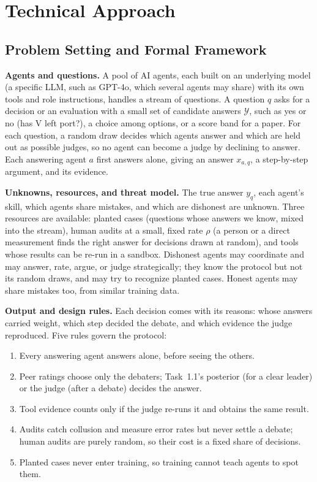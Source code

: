 \documentclass[12pt,letterpaper]{article}
\newcommand{\hd}[1]{\ifhmode\par\fi\addvspace{1pt}\noindent\textbf{#1}\hspace{0.35em}}
\begin{document}
\section{Technical Approach}\label{sec:approach}

\subsection{Problem Setting and Formal Framework}\label{sec:setting}
\hd{Agents and questions.} A pool of AI agents, each built on an underlying model (a specific LLM, such as GPT-4o, which several agents may share) with its own tools and role instructions, handles a stream of questions. A question $q$ asks for a decision or an evaluation with a small set of candidate answers $\mathcal{Y}$, such as yes or no (has V left port?), a choice among options, or a score band for a paper. For each question, a random draw decides which agents answer and which are held out as possible judges, so no agent can become a judge by declining to answer. Each answering agent $a$ first answers alone, giving an answer $x_{a,q}$, a step-by-step argument, and its evidence.

\hd{Unknowns, resources, and threat model.} The true answer $y_q$, each agent's skill, which agents share mistakes, and which are dishonest are unknown. Three resources are available: planted cases (questions whose answers we know, mixed into the stream), human audits at a small, fixed rate $\rho$ (a person or a direct measurement finds the right answer for decisions drawn at random), and tools whose results can be re-run in a sandbox. Dishonest agents may coordinate and may answer, rate, argue, or judge strategically; they know the protocol but not its random draws, and may try to recognize planted cases. Honest agents may share mistakes too, from similar training data.

\hd{Output and design rules.} Each decision comes with its reasons: whose answers carried weight, which step decided the debate, and which evidence the judge reproduced. Five rules govern the protocol:
\begin{enumerate}[label=(R\arabic*),leftmargin=2.6em]
\item Every answering agent answers alone, before seeing the others.
\item Peer ratings choose only the debaters; Task~1.1's posterior (for a clear leader) or the judge (after a debate) decides the answer.
\item Tool evidence counts only if the judge re-runs it and obtains the same result.
\item Audits catch collusion and measure error rates but never settle a debate; human audits are purely random, so their cost is a fixed share of decisions.
\item Planted cases never enter training, so training cannot teach agents to spot them.
\end{enumerate}
\end{document}
